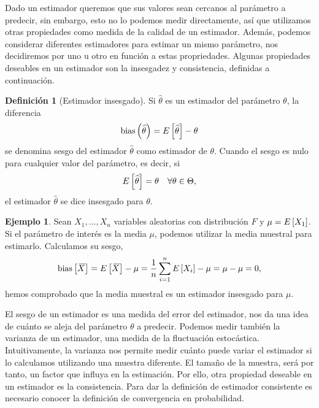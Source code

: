 \documentclass[10pt,a4paper]{article} %
\let\mathbb\relax
\newcommand{\bias}{\text{bias}}
\newcommand{\Var}{\text{Var}}
\newcommand{\olsi}[1]{\,\overline{\!{#1}}} %
\theoremstyle{definition}
\newtheorem{definition}{Definición}[section]
\newtheorem{example}[theorem]{Ejemplo}
\begin{document}
Dado un estimador queremos que sus valores sean cercanos al parámetro a predecir, sin embargo, esto no lo podemos medir directamente, así que utilizamos otras propiedades como medida de la calidad de un estimador. Además, podemos considerar diferentes estimadores para estimar un mismo parámetro, nos decidiremos por uno u otro en función a estas propriedades. Algunas propiedades deseables en un estimador son la insesgadez y consistencia, definidas a continuación.

\begin{definition}[Estimador insesgado]
  Si $\widehat{\theta}$ es un estimador del parámetro $\theta$, la diferencia \[
\bias\left( \widehat{\theta}\right) = \mathbb{E}\left [\widehat{\theta} \right ] - \theta
\]
se denomina sesgo del estimador $\widehat{\theta}$ como estimador de $\theta$. Cuando el sesgo es nulo para cualquier valor del parámetro, es decir, si\[
\mathbb{E} \left [\widehat{\theta}\right] = \theta\quad \forall\theta \in\Theta,
\]
el estimador $\widehat{\theta}$ se dice insesgado para $\theta$.
\end{definition}

\begin{example}\label{ej:medest}
  Sean $X_1,\dots,X_n$ variables aleatorias con distribución $F$ y $\mu = \E\left[X_1\right]$. Si el parámetro de interés es la media $\mu$, podemos utilizar la media muestral para estimarlo. Calculamos su sesgo,\[
\bias\left[\olsi{X} \right] = \E\left[ \olsi{X}\right] - \mu = \frac{1}{n} \sum_{i=1}^n\E \left [ X_i\right] - \mu = \mu - \mu = 0,
\]
hemos comprobado que la media muestral es un estimador insesgado para $\mu$.
\end{example}

El sesgo de un estimador es una medida del error del estimador, nos da una idea de cuánto se aleja del parámetro $\theta$ a predecir. Podemos medir también la varianza de un estimador, una medida de la fluctuación estocástica. Intuitivamente, la varianza nos permite medir cuánto puede variar el estimador si lo calculamos utilizando una muestra diferente. El tamaño de la muestra, será por tanto, un factor que influya en la estimación. Por ello, otra propiedad deseable en un estimador es la consistencia. Para dar la definición de estimador consistente es necesario conocer la definición de convergencia en probabilidad.

\end{document}
